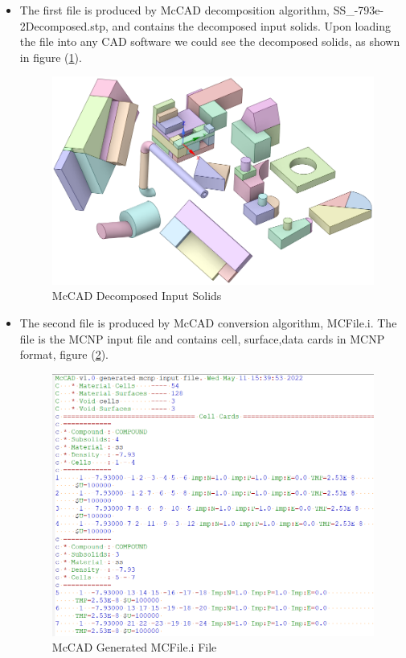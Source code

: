 \documentclass[letterpaper, 12 pt]{report}
\begin{document}
\begin{enumerate}
  \begin{itemize}
    \item The first file is produced by McCAD decomposition algorithm, SS\_-793e-2Decomposed.stp, and contains the decomposed input solids. Upon loading the file into any CAD software we could see the decomposed solids, as shown in figure (\ref{fig:Decomposed Solids}).
	\begin{figure}[h]
		\centering
		\includegraphics[scale=0.4]{figures/decomposedSolids.png}
		\caption{McCAD Decomposed Input Solids}
		\label{fig:Decomposed Solids}
	\end{figure}

	\item The second file is produced by McCAD conversion algorithm, MCFile.i. The file is the MCNP input file and contains cell, surface,data cards in MCNP format, figure (\ref{fig:MCFile}).
	\begin{figure}[h]
		\centering
		\includegraphics[scale=0.4]{figures/cellCards.png}
		\caption{McCAD Generated MCFile.i File}
		\label{fig:MCFile}
	\end{figure}


\end{itemize}
\end{enumerate}
\end{document}
